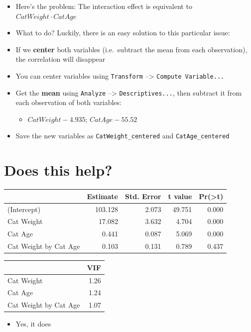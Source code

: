 \documentclass[]{article}
\providecommand{\tightlist}{%
  \setlength{\itemsep}{0pt}\setlength{\parskip}{0pt}}
\begin{document}
\begin{itemize}
\tightlist
\item
  Here's the problem: The interaction effect is equivalent to
  \(CatWeight \cdot CatAge\)
\item
  What to do? Luckily, there is an easy solution to this particular
  issue:
\item
  If we \textbf{center} both variables (i.e.~subtract the mean from each
  observation), the correlation will disappear
\item
  You can center variables using \texttt{Transform} --\textgreater{}
  \texttt{Compute\ Variable...}
\item
  Get the \textbf{mean} using \texttt{Analyze} --\textgreater{}
  \texttt{Descriptives...}, then subtract it from each observation of
  both variables:

  \begin{itemize}
  \tightlist
  \item
    \(CatWeight - 4.935\); \(CatAge - 55.52\)
  \end{itemize}
\item
  Save the new variables as \texttt{CatWeight\_centered} and
  \texttt{CatAge\_centered}
\end{itemize}

\section{Does this help?}\label{does-this-help}

\begin{longtable}[]{@{}lrrrr@{}}
\toprule
& Estimate & Std. Error & t value &
Pr(\textgreater{}\textbar{}t\textbar{})\tabularnewline
\midrule
\endhead
(Intercept) & 103.128 & 2.073 & 49.751 & 0.000\tabularnewline
Cat Weight & 17.082 & 3.632 & 4.704 & 0.000\tabularnewline
Cat Age & 0.441 & 0.087 & 5.069 & 0.000\tabularnewline
Cat Weight by Cat Age & 0.103 & 0.131 & 0.789 & 0.437\tabularnewline
\bottomrule
\end{longtable}

\begin{longtable}[]{@{}lr@{}}
\toprule
& VIF\tabularnewline
\midrule
\endhead
Cat Weight & 1.26\tabularnewline
Cat Age & 1.24\tabularnewline
Cat Weight by Cat Age & 1.07\tabularnewline
\bottomrule
\end{longtable}

\begin{itemize}
\tightlist
\item
  Yes, it does
\end{itemize}
\end{document}
